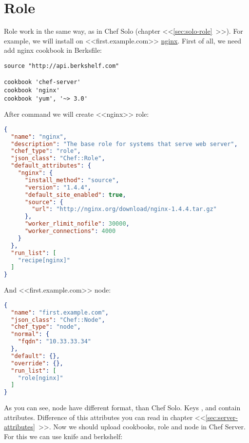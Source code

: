\section{Role}
\label{sec:server-role}

Role work in the same way, as in Chef Solo (chapter <<\ref{sec:solo-role}~>>). For example, we will install on <<first.example.com>> \href{http://community.opscode.com/cookbooks/nginx}{nginx}. First of all, we need add nginx cookbook in Berksfile:

\begin{lstlisting}[label=lst:my-serer-cloud-role1,title=my-server-cloud/Berksfile]
source "http://api.berkshelf.com"

cookbook 'chef-server'
cookbook 'nginx'
cookbook 'yum', '~> 3.0'
\end{lstlisting}

After command  we will create <<nginx>> role:

\begin{lstlisting}[language=JSON,label=lst:my-serer-cloud-role2,title=my-server-cloud/roles/nginx.json]
{
  "name": "nginx",
  "description": "The base role for systems that serve web server",
  "chef_type": "role",
  "json_class": "Chef::Role",
  "default_attributes": {
    "nginx": {
      "install_method": "source",
      "version": "1.4.4",
      "default_site_enabled": true,
      "source": {
        "url": "http://nginx.org/download/nginx-1.4.4.tar.gz"
      },
      "worker_rlimit_nofile": 30000,
      "worker_connections": 4000
    }
  },
  "run_list": [
    "recipe[nginx]"
  ]
}
\end{lstlisting}

And <<first.example.com>> node:

\begin{lstlisting}[language=JSON,label=lst:my-serer-cloud-role3,title=my-server-cloud/nodes/first.example.com.json]
{
  "name": "first.example.com",
  "json_class": "Chef::Node",
  "chef_type": "node",
  "normal": {
    "fqdn": "10.33.33.34"
  },
  "default": {},
  "override": {},
  "run_list": [
    "role[nginx]"
  ]
}
\end{lstlisting}

As you can see, node have different format, than Chef Solo. Keys ,  and  contain attributes. Difference of this attributes you can read in chapter <<\ref{sec:server-attributes}~>>. Now we should upload cookbooks, role and node in Chef Server. For this we can use knife and berkshelf:

